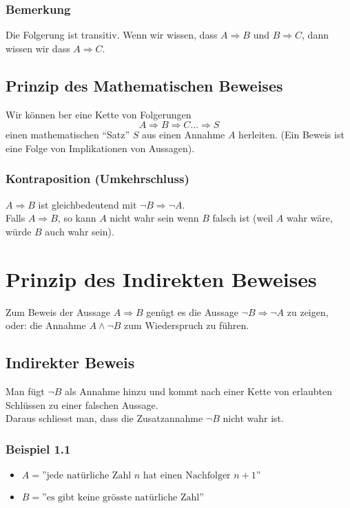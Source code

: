 \subsubsection*{Bemerkung}
Die Folgerung ist transitiv. Wenn wir wissen, dass $A\Rightarrow B$ und $B\Rightarrow C$, dann wissen wir dass $A\Rightarrow C$.


\subsection*{Prinzip des Mathematischen Beweises}
Wir können ber eine Kette von Folgerungen \[A\Rightarrow B \Rightarrow C \dots \Rightarrow S\]
einen mathematischen ``Satz'' $S$ aus einen Annahme $A$ herleiten. (Ein Beweis ist eine Folge von Implikationen von Aussagen). 
\subsubsection*{Kontraposition (Umkehrschluss)}

$A\Rightarrow B$ ist gleichbedeutend mit $\lnot B\Rightarrow\lnot A$.\\
Falls $A\Rightarrow B$, so kann $A$ nicht wahr sein wenn $B$ falsch ist (weil $A$ wahr wäre, würde $B$ auch wahr sein).

\section{Prinzip des Indirekten Beweises}
Zum Beweis der Aussage $A\Rightarrow B$ genügt es die Aussage $\lnot B\Rightarrow\lnot A$ zu zeigen, oder: die Annahme $A\land\lnot B$ zum Wiederspruch zu führen.

\subsection*{Indirekter Beweis}
Man fügt $\lnot B$ als Annahme hinzu und kommt nach einer Kette von erlaubten Schlüssen zu einer falschen Aussage.\\

\noindent Daraus schliesst man, dass die Zusatzannahme $\lnot B$ nicht wahr ist. 

\subsubsection*{Beispiel 1.1}
\begin{itemize}
\item $A=\text{''jede natürliche Zahl } n \text{ hat einen Nachfolger } n+1\text{''}$
\item $B=\text{''es gibt keine grösste natürliche Zahl''}$
\end{itemize}

